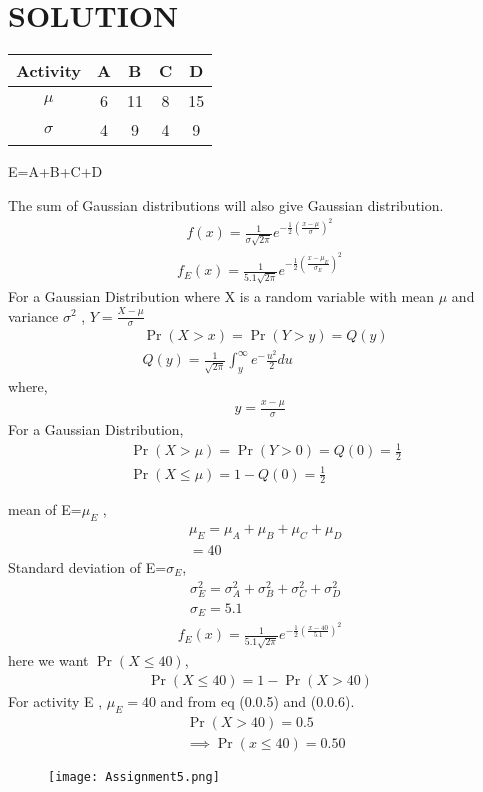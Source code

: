 \documentclass[journal,12pt,twocolumn]{IEEEtran}
\begin{document}
\section*{SOLUTION}
\begin{table}[h!]
\centering
\begin{tabular}{|c||c|c|c|c|}
    \hline
    Activity & A& B& C& D \\
    \hline
    $\mu$ & 6& 11& 8& 15\\[1ex]
    \hline
   $\sigma$ & 4& 9& 4& 9\\[1ex]
    \hline
\end{tabular}
\end{table}
E=A+B+C+D

The sum of Gaussian distributions will also give Gaussian distribution.
\begin{align}
f(x)=\frac{1}{\sigma\sqrt{2\pi}}e^{-\frac{1}{2}\left(\frac{x-\mu}{\sigma}\right)^2}
\end{align}
\begin{align}
f_E(x)=\frac{1}{5.1\sqrt{2\pi}}e^{-\frac{1}{2}\left(\frac{x-\mu_E}{\sigma_E}\right)^2}
\end{align}
For a Gaussian Distribution where X is a random variable with mean $\mu$ and variance $\sigma^2$ , $Y=\frac{X-\mu}{\sigma}$
\begin{align}
&\Pr(X>x)=\Pr(Y>y)=Q(y)\\
&Q(y)=\frac{1}{\sqrt{2\pi}}\int_{y}^{\infty}e^-\frac{u^2}{2}du
\end{align}
where,
\begin{align*}
y=\frac{x-\mu}{\sigma}
\end{align*}
For a Gaussian Distribution,
\begin{align}
&\Pr(X>\mu)=\Pr(Y>0)=Q(0)=\frac{1}{2}\\
&\Pr(X\leq \mu)=1-Q(0)=\frac{1}{2}
\end{align}

mean of E=$\mu_E$ ,
\begin{align}
&\mu_E=\mu_A+\mu_B+\mu_C+\mu_D\\
&=40
\end{align}
Standard deviation of E=$\sigma_E$,
\begin{align}
&\sigma_E^2=\sigma_A^2+\sigma_B^2+\sigma_C^2+\sigma_D^2\\
&\sigma_E=5.1
\end{align}
\begin{align}
f_E(x)=\frac{1}{5.1\sqrt{2\pi}}e^{-\frac{1}{2}\left(\frac{x-40}{5.1}\right)^2}
\end{align}
here we want $\Pr(X\leq40)$,
\begin{align}
\Pr(X\leq40)=1-\Pr(X>40)    
\end{align}
For activity E , $\mu_E=40$ and from eq (0.0.5) and (0.0.6). 
\begin{align}
&\Pr(X>40)=0.5\\
&\implies\Pr(x\leq40)=0.50
\end{align}
\begin{figure}[h]
    \centering
    \texttt{[image: Assignment5.png]}
    \label{fig:my_label}
\end{figure}
\end{document}
